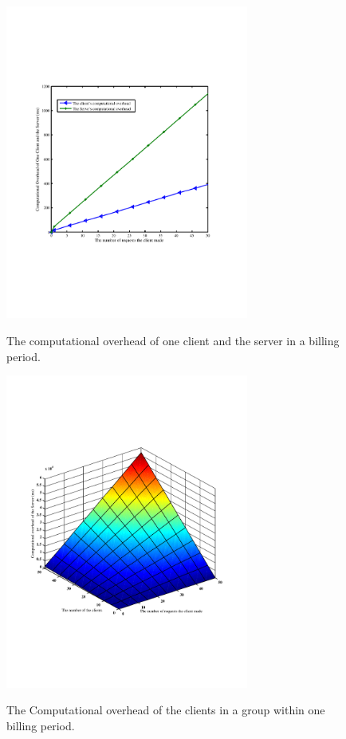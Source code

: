 \documentclass[letterpaper,12pt]{article}
\begin{document}
\begin{figure}[!htb] \centering
  \includegraphics[width=8.0cm]{Computation_overhead_one_client}\\
  \caption{The computational overhead of one client and the server in a billing period.} \label{sec:Computationoverhead_one_Client}
\end{figure}
\begin{figure}[!htb] \centering
  \includegraphics[width=8.0cm]{Computationoverhead_the_server}\\
  \caption{The Computational overhead of the clients in a group within one billing period.} \label{sec:Computationoverhead_the_server}
\end{figure}
\end{document}

